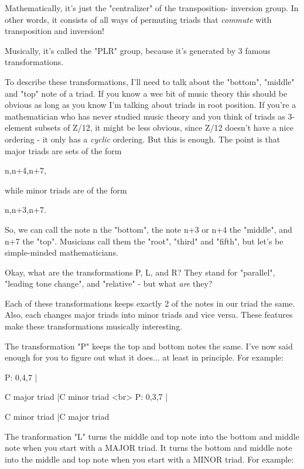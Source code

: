 Mathematically, it's just the "centralizer" of the transposition-
inversion group.   In other words, it consists of all ways of
permuting triads that \emph{commute} with transposition and inversion!

Musically, it's called the "PLR" group, because it's generated
by 3 famous transformations.  

To describe these transformations, I'll need to talk about the
"bottom", "middle" and "top" note of a
triad.  If you know a wee bit of music theory this should be obvious
as long as you know I'm talking about triads in root position.  If
you're a mathematician who has never studied music theory and you
think of triads as 3-element subsets of Z/12, it might be less
obvious, since Z/12 doesn't have a nice ordering - it only has a
\emph{cyclic} ordering.  But this is enough.  The point is that major
triads are sets of the form

{n,n+4,n+7}, 

while minor triads are of the form 

{n,n+3,n+7}.  

So, we can call the note n the "bottom", the note n+3 or n+4
the "middle", and n+7 the "top".  Musicians call
them the "root", "third" and "fifth",
but let's be simple-minded mathematicians.

Okay, what are the transformations P, L, and R?  They stand for
"parallel", "leading tone change", and
"relative" - but what \emph{are} they?

Each of these transformations keeps exactly 2 of the notes 
in our triad the same.  Also, each changes major triads into
minor triads and vice versa.  These features make these 
transformations musically interesting.

The transformation "P" keeps the top and bottom notes the same.
I've now said enough for you to figure out what it does... 
at least in principle.  For example:

P: {0,4,7} |         
                  
                  
    C major triad |\to  C minor triad <br>
P: {0,3,7} |        
                  
                  
     C minor triad |\to  C major triad

The tranformation "L" turns the middle and top note into the bottom
and middle note when you start with a MAJOR triad.  It turns the 
bottom and middle note into the middle and top note when you start 
with a MINOR triad.  For example:

